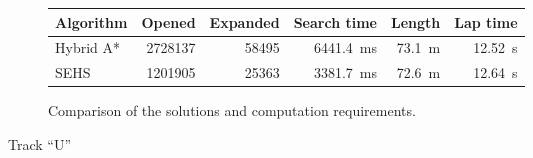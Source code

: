 \begin{figure}[!tbp]
	\vspace{0.75cm}
	
	\begin{subfigure}[t]{\textwidth}
		\centering
		\begin{tabular}{l r r r r r}%
		\toprule
		Algorithm & Opened & Expanded & Search time & Length & Lap time \\
		\midrule
		Hybrid A* & \num{2728137} & \num{58495} & \SI{6441.4}{\milli\second} & \SI{73.1}{\meter} & \bftab \SI{12.52}{\second} \\
		SEHS & \bftab \num{1201905} & \bftab \num{25363} & \bftab \SI{3381.7}{\milli\second} & \SI{72.6}{\meter} & \SI{12.64}{\second} \\
		\bottomrule
	\end{tabular}
	\caption{Comparison of the solutions and computation requirements.}
	\label{table:u}
	\end{subfigure}
	
	\vspace{0.75cm}
	
	\caption{Track ``U''}
	\label{fig:u}
\end{figure}

